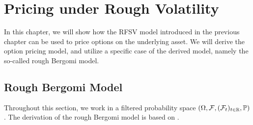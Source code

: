 \chapter{Pricing under Rough Volatility}
In this chapter, we will show how the RFSV model introduced in the previous chapter can be used to price options on the underlying asset. We will derive the option pricing model, and utilize a specific case of the derived model, namely the so-called rough Bergomi model.

\section{Rough Bergomi Model}
Throughout this section, we work in a filtered probability space $\left(\Omega,\mathcal{F}, (\mathcal{F}_{t})_{t\in\R},\mathbb{P}\right)$. The derivation of the rough Bergomi model is based on \cite{pricing}. 

